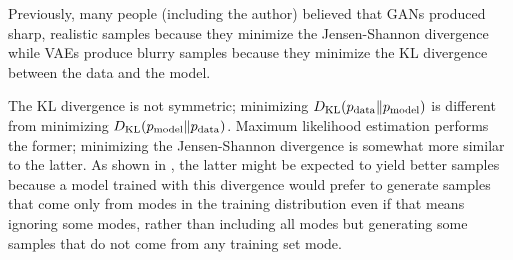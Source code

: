   Previously, many people (including the author) believed that GANs produced sharp,
  realistic samples because they minimize the Jensen-Shannon divergence while
  VAEs produce blurry samples because they minimize the KL divergence between the
  data and the model.

  The KL divergence is not symmetric; minimizing $D_{\mathrm{KL}}(p_{\rm{data}} \Vert p_{\rm{model}})$
  is different from minimizing $D_{\mathrm{KL}}(p_{\rm{model}} \Vert p_{\rm{data}})$.
  Maximum likelihood estimation performs the former; minimizing the Jensen-Shannon
  divergence is somewhat more similar to the latter.
  As shown in , the latter might be expected to yield better samples
  because a model trained with this divergence would prefer
  to generate samples that come only from modes in the training distribution
  even if that means ignoring some modes, rather than
  including all modes but generating some samples that do not come 
  from any training set mode.

